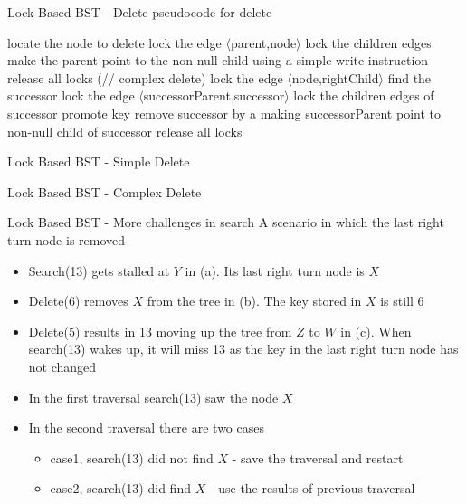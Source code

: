 \documentclass{beamer}
\begin{document}
\begin{frame}[c]{Lock Based BST - Delete}
pseudocode for delete
\begin{algorithm}[H]
locate the node to delete\;
{
lock the edge $\langle$parent,node$\rangle$\;
lock the children edges\;
make the parent point to the non-null child using a simple write instruction\;
release all locks\;
}
\Else(// complex delete)
{
lock the edge $\langle$node,rightChild$\rangle$\;
find the successor\;
lock the edge $\langle$successorParent,successor$\rangle$\;
lock the children edges of successor\;
promote key\;
remove successor by a making successorParent point to non-null child of successor\;
release all locks\;
}
\end{algorithm}
\end{frame}

\begin{frame}[c]{Lock Based BST - Simple Delete}

\end{frame}

\begin{frame}[c]{Lock Based BST - Complex Delete}

\end{frame}

\begin{frame}{Lock Based BST - More challenges in search}
A scenario in which the last right turn node is removed

\begin{itemize}
\item<1> \footnotesize Search(13) gets stalled at $Y$ in (a). Its last right turn node is $X$
\item<2> \footnotesize Delete(6) removes $X$ from the tree in (b). The key stored in $X$ is still 6
\item<3> \footnotesize Delete(5) results in 13 moving up the tree from $Z$ to $W$ in (c). When search(13) wakes up, it will miss 13 as the key in the last right turn node has not changed
\end{itemize}


\begin{itemize}
\item<4> \footnotesize In the first traversal search(13) saw the node $X$
\item<4> \footnotesize In the second traversal there are two cases
\begin{itemize}
\item<4> \tiny case1, search(13) did not find $X$ - save the traversal and restart
\item<4> \tiny case2, search(13) did find $X$ - use the results of previous traversal
\end{itemize}
\end{itemize}

\end{frame}
\end{document}
